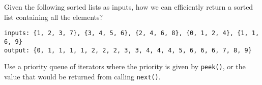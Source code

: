 \begin{blocksection}
\question Given the following sorted lists as inputs, how we can efficiently
return a sorted list containing all the elements?

\begin{lstlisting}
inputs: {1, 2, 3, 7}, {3, 4, 5, 6}, {2, 4, 6, 8}, {0, 1, 2, 4}, {1, 1, 6, 9}
output: {0, 1, 1, 1, 1, 2, 2, 2, 3, 3, 4, 4, 4, 5, 6, 6, 6, 7, 8, 9}
\end{lstlisting}

\begin{solution}[0.5in]
Use a priority queue of iterators where the priority is given by
\lstinline$peek()$, or the value that would be returned from calling
\lstinline$next()$.
\end{solution}
\end{blocksection}
